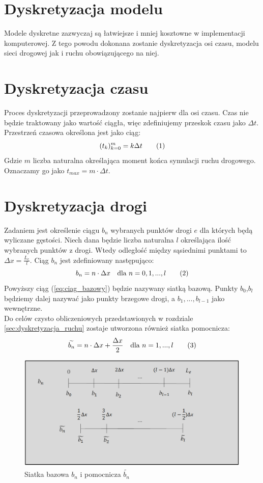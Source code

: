 \documentclass[12pt]{book}
\newcommand\addtag{\refstepcounter{equation}
\tag{\theequation}}
\begin{document}
\section{Dyskretyzacja modelu}
Modele dyskretne zazwyczaj są łatwiejsze i mniej kosztowne w implementacji komputerowej. Z tego powodu dokonana zostanie dyskretyzacja osi czasu, modelu sieci drogowej jak i ruchu obowiązującego na niej.
\section{Dyskretyzacja czasu}
Proces dyskretyzacji przeprowadzony zostanie najpierw dla osi czasu. Czas nie będzie traktowany jako wartość ciągła, więc zdefiniujemy przeskok czasu jako $\Delta t$. Przestrzeń czasowa określona jest jako ciąg:
\[
(t_k)_{k=0}^m=k\Delta t \addtag
\]
Gdzie $m$ liczba naturalna określająca moment końca symulacji ruchu drogowego. Oznaczamy go jako $t_{max}=m \cdot \Delta t$.


\section{Dyskretyzacja drogi}
Zadaniem jest określenie ciągu $b_n$ wybranych punktów drogi $e$ dla których będą wyliczane gęstości. Niech dana będzie liczba naturalna $l$ określająca ilość wybranych punktów z drogi. Wtedy odległość między sąsiednimi punktami to $\Delta x=\frac{L_e}{l}$. 
Ciąg $b_n$ jest zdefiniowany następująco: 
\[b_n=n\cdot \Delta x \quad \text{dla }n=0,1,...,l \addtag \label{eq:ciag_bazowy} \]
Powyższy ciąg (\ref{eq:ciag_bazowy}) będzie nazywany siatką bazową. Punkty $b_0$,$b_l$ będziemy dalej nazywać jako punkty brzegowe drogi, a $b_1,...,b_{l-1}$ jako wewnętrzne.\\
Do celów czysto obliczeniowych przedstawionych w rozdziale \ref{sec:dyskretyzacja_ruchu} zostaje utworzona również siatka pomocnicza:
\[\widetilde{b_n}=n\cdot \Delta x+\frac{\Delta x}{2} \quad \text{dla }n=1,...,l \addtag\]

\begin{figure}[H]
  \centering
    \includegraphics[width=14cm]{odcinki-2}
 \caption{Siatka bazowa $b_n$ i pomocnicza $\widetilde{b_n}$}
 \label{fig:siatka}
\end{figure}
\end{document}

